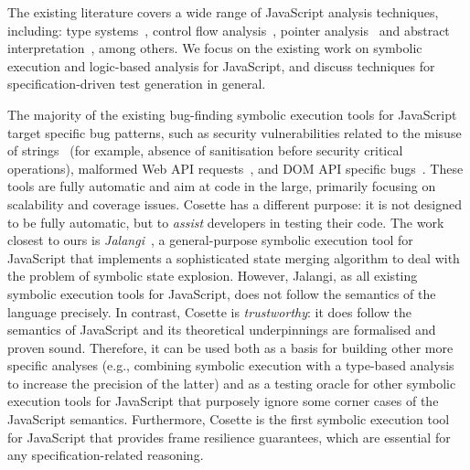 \documentclass[sigconf, review]{acmart}
\newcommand{\polish}[1]{{\color{red}#1}}
\newcommand{\cosette}{Cosette\xspace}
\newcommand{\myparagraph}[1]{\smallskip\noindent {\bf #1.}\hspace{1pt}}
\begin{document}
The existing literature covers a wide range of JavaScript analysis techniques, including: 
type systems~\cite{thiemann:esop:2005,anderson:ecoop:2005,jensen:sas:2009,typescript:toot:2014,feldthaus:oopsla:2014,bierman:ecoop:2014,rastogi:popl:2015},
control flow analysis~\cite{feldthaus2013efficient}, pointer analysis~\cite{jang2009points,sridharan:ecoop:12} and abstract
interpretation~\cite{kashyap:fse:14,jensen:sas:2009,andreasen:oopsla:2014,park:ecoop:15}, among others. We focus on the existing work on symbolic execution and  
logic-based analysis for JavaScript, and discuss techniques for specification-driven 
test generation in general.  

\myparagraph{Symbolic Execution for JS}
The majority of the existing bug-finding symbolic execution tools for JavaScript target specific bug patterns, 
such as security vulnerabilities related to the misuse of strings~\cite{saxena:sp:2010} 
(for example, absence of sanitisation before security critical operations), malformed Web API requests~\cite{wittern:icse:2018}, and
DOM API specific bugs~\cite{li:fse:2014}. These tools are fully automatic and aim at code in 
the large, primarily focusing on scalability and coverage issues. \cosette has a different 
purpose: it is not designed to be fully automatic, but to \emph{assist} developers in 
testing their code. 
%
The work closest to ours is \emph{Jalangi}~\cite{koushik:fse:2015}, a general-purpose 
symbolic execution tool for JavaScript that implements a sophisticated state merging 
algorithm to deal with the problem of symbolic state explosion. 
%
However, Jalangi, as all existing symbolic execution tools for JavaScript, does not follow 
the semantics of the language precisely. 
%
In contrast, \cosette is \emph{trustworthy}: it does follow the semantics of 
JavaScript and its theoretical underpinnings are formalised and proven sound. 
Therefore, it can be used both as a basis for building other more specific analyses 
(e.g., combining symbolic execution with a type-based analysis to increase the precision of the latter) and 
as a testing oracle for other symbolic execution tools for JavaScript that purposely 
ignore some corner cases of the JavaScript semantics. 
Furthermore, \cosette is the first symbolic execution tool for JavaScript that provides 
frame resilience guarantees, which are essential for any specification-related reasoning.

%
\end{document}
